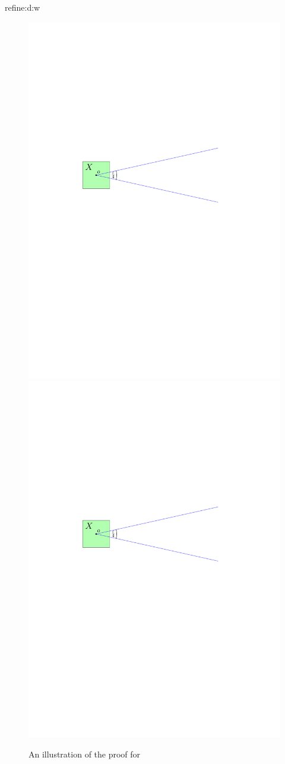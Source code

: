 \begin{proof:in:appendix:e}{}{refine:d:w}
    \begin{figure}[h]
        \phantom{}\hfill%
        \includegraphics[page=2,
        width=0.48\linewidth]{../figs/double_wedge}%
        \hfill%
        \includegraphics[page=3,
        width=0.48\linewidth]{../figs/double_wedge}%
        \hfill%
        \phantom{}%
        \caption{An illustration of the proof for }
    \end{figure}


\end{proof:in:appendix:e}
